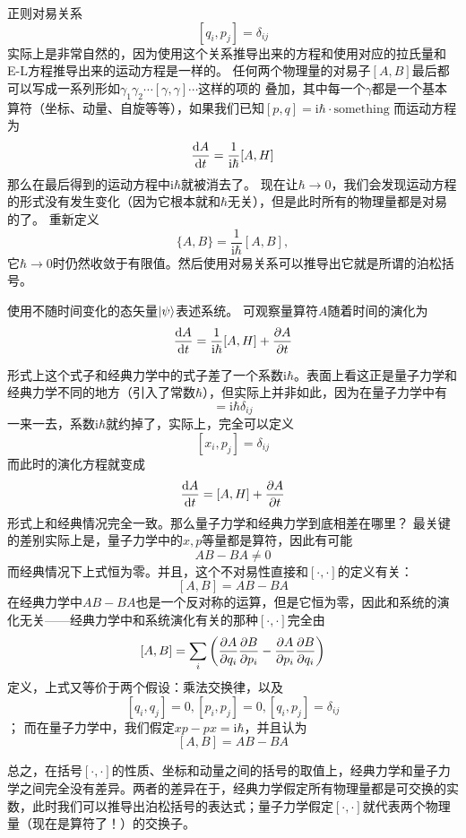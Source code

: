 \documentclass[UTF8, a4paper]{ctexart}
\newcommand*{\ii}{\mathrm{i}}
\begin{document}
正则对易关系
\[
    [q_i, p_j] = \delta_{ij}
\]
实际上是非常自然的，因为使用这个关系推导出来的方程和使用对应的拉氏量和E-L方程推导出来的运动方程是一样的。
任何两个物理量的对易子$[A,B]$最后都可以写成一系列形如$\gamma_1 \gamma_2 \cdots [\gamma, \gamma] \cdots$这样的项的
叠加，其中每一个$\gamma$都是一个基本算符（坐标、动量、自旋等等），如果我们已知$[p, q] = \ii \hbar \cdot \text{something}$
而运动方程为
\[
    \dv{A}{t} = \frac{1}{\ii \hbar} [A, H]
\]
那么在最后得到的运动方程中$\ii \hbar$就被消去了。
现在让$\hbar \to 0$，我们会发现运动方程的形式没有发生变化（因为它根本就和$\hbar$无关），但是此时所有的物理量都是对易的了。
重新定义
\[
    \{A, B\} = \frac{1}{\ii \hbar}[A, B],
\]
它$\hbar \to 0$时仍然收敛于有限值。然后使用对易关系可以推导出它就是所谓的泊松括号。

使用不随时间变化的态矢量$\ket{\psi}$表述系统。
可观察量算符$A$随着时间的演化为
\begin{equation}
    \dv{A}{t} = \frac{1}{\ii \hbar} [A, H] + \pdv{A}{t}
    \label{eq:canonical-time-evolution}
\end{equation}

形式上这个式子和经典力学中的式子差了一个系数$\ii \hbar$。表面上看这正是量子力学和经典力学不同的地方（引入了常数$\hbar$），但实际上并非如此，因为在量子力学中有
\begin{equation}
    [x_i, p_j] = \ii \hbar \delta_{ij}
\end{equation}
一来一去，系数$\ii \hbar$就约掉了，实际上，完全可以定义
\[
    [x_i, p_j] = \delta_{ij}
\]
而此时的演化方程就变成
\[
    \dv{A}{t} = [A, H] + \pdv{A}{t}
\]
形式上和经典情况完全一致。那么量子力学和经典力学到底相差在哪里？
最关键的差别实际上是，量子力学中的$x, p$等量都是算符，因此有可能
\[
    AB - BA \neq 0
\]
而经典情况下上式恒为零。并且，这个不对易性直接和$[\cdot, \cdot]$的定义有关：
\[
    [A, B] = AB - BA
\]
在经典力学中$AB-BA$也是一个反对称的运算，但是它恒为零，因此和系统的演化无关——经典力学中和系统演化有关的那种$[\cdot, \cdot]$完全由
\[
    [A, B] = \sum_i \left( \pdv{A}{q_i} \pdv{B}{p_i} - \pdv{A}{p_i} \pdv{B}{q_i} \right)
\]
定义，上式又等价于两个假设：乘法交换律，以及
\[
    [q_i, q_j] = 0, [p_i, p_j] = 0, [q_i, p_j] = \delta_{ij}
\]；
而在量子力学中，我们假定$xp-px=\ii \hbar$，并且认为
\[
    [A, B] = AB - BA
\]

总之，在括号$[\cdot, \cdot]$的性质、坐标和动量之间的括号的取值上，经典力学和量子力学之间完全没有差异。两者的差异在于，经典力学假定所有物理量都是可交换的实数，此时我们可以推导出泊松括号的表达式；量子力学假定$[\cdot, \cdot]$就代表两个物理量（现在是算符了！）的交换子。
\end{document}
